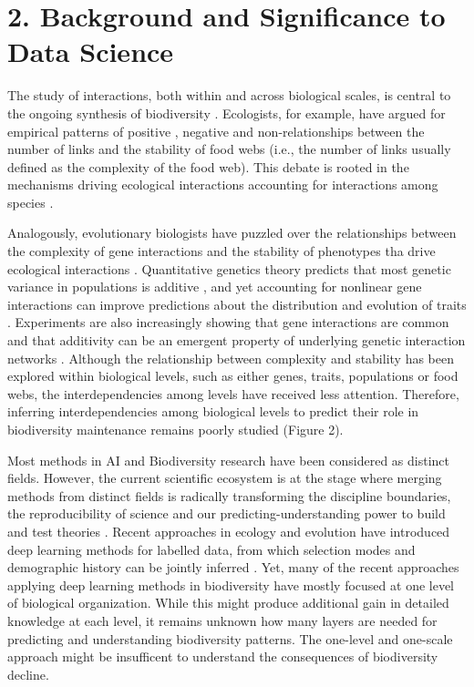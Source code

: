 \documentclass[11pt]{article}
\begin{document}
\newpage
\section*{2. Background and Significance to Data Science}%
The study of interactions, both within and across biological scales,
is central to the ongoing synthesis of biodiversity
\citep{Darwin:1964,Futuyma&Slatkin:1983,Thompson:2013}. Ecologists,
for example, have argued for empirical patterns of positive
\citep{MacArthur:1955}, negative \citep{May:1973} and
non-relationships \citep{Jacquetetal:2016} between the number of links
and the stability of food webs (i.e., the number of links usually
defined as the complexity of the food web). This debate is rooted in
the mechanisms driving ecological interactions accounting for
interactions among species
\citep{May:1973,dunne2005modeling,Thebault&Fontaine:2010,Allesina&Tang:2012,Johnsonetal:2014,Mougi&Kondoh:2016,Graveletal:2016}.

Analogously, evolutionary biologists have puzzled over the
relationships between the complexity of gene interactions and the
stability of phenotypes tha drive ecological interactions
\citep{Alberch:1991,Arnold:1992,Debat&David:2001,Wagner:2005}. Quantitative
genetics theory predicts that most genetic variance in populations is
additive \citep{Hilletal:2008}, and yet accounting for nonlinear gene
interactions can improve predictions about the distribution and
evolution of traits \citep{Forsbergetal:2017}. Experiments are also
increasingly showing that gene interactions are common and that
additivity can be an emergent property of underlying genetic
interaction networks
\citep{Stearns:2010,EyreWalker:2010,Wagner&Zhang:2011,Mackay:2014,North&Beaumont:2015,Pavlicevetal:2015}. Although
the relationship between complexity and stability has been explored
within biological levels, such as either genes, traits, populations or
food webs, the interdependencies among levels have received less
attention. Therefore, inferring interdependencies among biological
levels to predict their role in biodiversity maintenance remains
poorly studied
\citep{Whithametal:2006,Loeuille:2010,Fontaineetal:2011,Melianetal:2018}
(Figure 2).

Most methods in AI and Biodiversity research have been considered as
distinct fields. However, the current scientific ecosystem is at the
stage where merging methods from distinct fields is radically
transforming the discipline boundaries, the reproducibility of science
and our predicting-understanding power to build and test theories
\citep{Reichsteinetal:2019}. Recent approaches in ecology and
evolution have introduced deep learning methods for labelled data,
from which selection modes and demographic history can be jointly
inferred \citep{Sheehanetal:2016}. Yet, many of the recent approaches
applying deep learning methods in biodiversity have mostly focused at
one level of biological organization. While this might produce
additional gain in detailed knowledge at each level, it remains
unknown how many layers are needed for predicting and understanding
biodiversity patterns. The one-level and one-scale approach might be
insufficent to understand the consequences of biodiversity decline.
\end{document}
